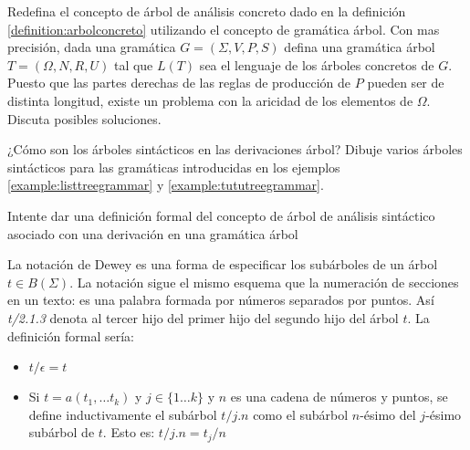 \begin{exercise}
Redefina el concepto de árbol de análisis concreto dado
en la definición \ref{definition:arbolconcreto} utilizando el
concepto de gramática árbol. Con mas precisión,
dada una gramática $G = (\Sigma, V, P, S)$ defina una gramática
árbol $T = (\Omega, N, R, U)$ tal que $L(T)$ sea el lenguaje 
de los árboles concretos de $G$. Puesto que las partes 
derechas de las reglas de producción de $P$ pueden ser 
de distinta longitud, existe un problema con
la aricidad de los elementos de $\Omega$. Discuta posibles
soluciones.
\end{exercise}

\begin{exercise}
¿Cómo son los árboles sintácticos en las derivaciones árbol?
Dibuje varios árboles sintácticos para las gramáticas 
introducidas en los ejemplos 
\ref{example:listtreegrammar}
y \ref{example:tututreegrammar}.

Intente dar una definición formal del concepto de árbol de análisis
sintáctico asociado con una derivación en una gramática árbol
\end{exercise}

\begin{definition} 
\label{definition:eyapdewey}
La notación de Dewey es una forma de especificar los subárboles
de un árbol $t \in B(\Sigma)$. La notación sigue el mismo
esquema que la numeración de secciones en un texto: 
es una palabra formada por números separados
por puntos. Así {\it t/2.1.3 }
denota al tercer hijo del primer hijo del segundo hijo
del árbol $t$.
La definición formal sería:
\begin{itemize}
\item
$t/\epsilon = t$
\item
Si $t = a(t_1, \ldots t_k)$ y $j \in \{ 1 \ldots k \}$ y $n$ es una 
cadena de números y puntos, se define 
inductivamente el subárbol $t/j.n$ como el subárbol $n$-ésimo del
$j$-ésimo subárbol de $t$. Esto es: $t/j.n = t_j/n$
\end{itemize}
\end{definition}

